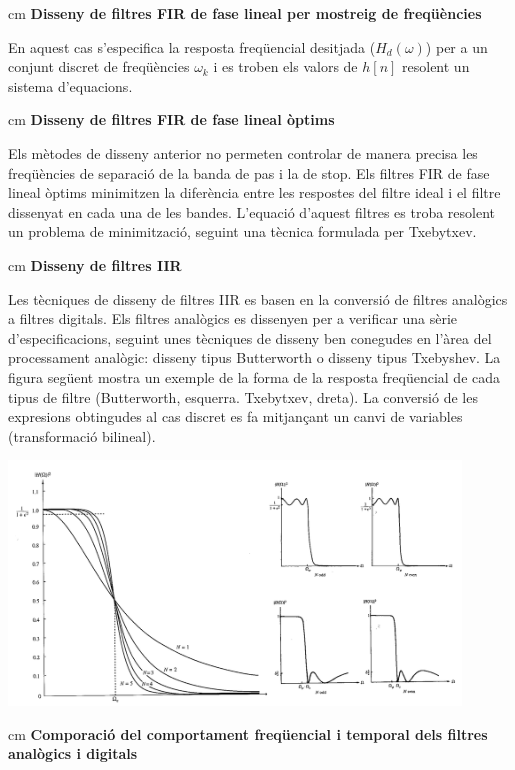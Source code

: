 \documentclass{article}
\begin{document}
 cm
\textbf{Disseny de filtres FIR de fase lineal per mostreig de freqüències}

En aquest cas s'especifica la resposta freqüencial desitjada ($H_d(\omega)$) per a un conjunt discret de freqüències $\omega_k$
i es troben els valors de $h[n]$ resolent un sistema d'equacions.

 cm
\textbf{Disseny de filtres FIR de fase lineal òptims}

Els mètodes de disseny anterior no permeten controlar de manera precisa les freqüències de
separació de la banda de pas i la de stop.
Els filtres FIR de fase lineal òptims minimitzen la diferència entre les respostes del filtre
ideal i el filtre dissenyat en cada una de les bandes. L'equació d'aquest filtres es troba
resolent un problema de minimització, seguint una tècnica formulada per Txebytxev.

 cm
\textbf{Disseny de filtres IIR}

Les tècniques de disseny de filtres IIR es basen en la conversió de filtres analògics a filtres
digitals. Els filtres analògics es dissenyen per a verificar una sèrie d'especificacions,
seguint unes tècniques de disseny ben conegudes en l'àrea del processament analògic: disseny
tipus Butterworth o disseny tipus Txebyshev. La figura següent mostra un exemple
de la forma de la resposta freqüencial de cada tipus de filtre (Butterworth, esquerra. Txebytxev, dreta). 
La conversió de les expresions
obtingudes al cas discret es fa mitjançant un canvi de variables (transformació bilineal).

\begin{center}
\includegraphics[width=12cm]{ButtTxeby.png}
\end{center}


 cm
\noindent
\textbf{\large Comporació del comportament freqüencial i temporal dels filtres analògics i digitals}
\end{document}
